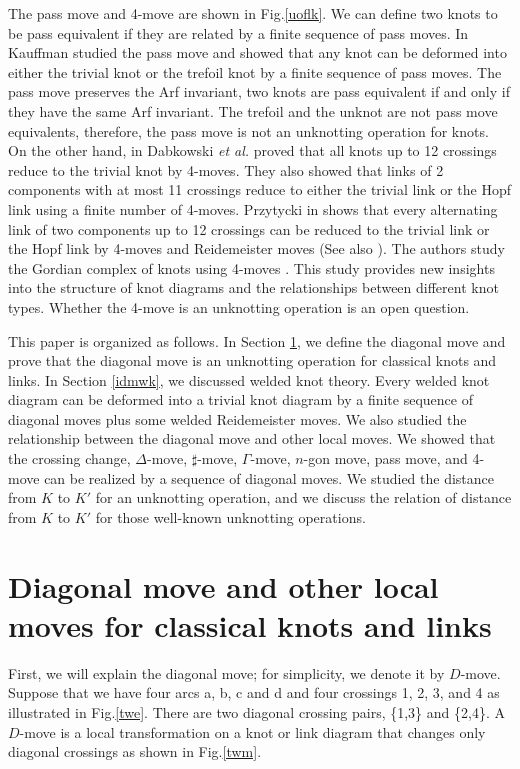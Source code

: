 \documentclass[12pt]{amsart}
\theoremstyle{remark}
\begin{document}
The pass move and 4-move are shown in Fig.\ref{uoflk}. We can define two knots to be pass equivalent if they are related by a finite sequence of pass moves.  In \cite{lhk} Kauffman studied the pass move and showed that any knot can be deformed into either the trivial knot or the trefoil knot by a finite sequence of pass moves. The pass move preserves the Arf invariant, two knots are pass equivalent if and only if they have the same Arf invariant. The trefoil and the unknot are not pass move equivalents, therefore, the pass move is not an unknotting operation for knots. On the other hand, in \cite{mk} Dabkowski {\it et al.} proved that all knots up to 12 crossings reduce to the trivial knot by 4-moves. They also showed that links of 2 components with at most 11 crossings reduce to either the trivial link or the Hopf link using a finite number of 4-moves. Przytycki in \cite{jhp} shows that every alternating link of two components up to 12 crossings can be reduced to the trivial link or the Hopf link by 4-moves and Reidemeister moves (See also \cite{as, ak1}). The authors study the Gordian complex of knots using 4-moves \cite{danish1}. This study provides new insights into the structure of knot diagrams and the relationships between different knot types. Whether the 4-move is an unknotting operation is an open question. 

 This paper is organized as follows. In Section \ref{idm}, we define the diagonal move and prove that the diagonal move is an unknotting operation for classical knots and links. In Section \ref{idmwk}, we discussed welded knot theory. Every welded knot diagram can be deformed into a trivial knot diagram by a finite sequence of diagonal moves plus some welded Reidemeister moves. We also studied the relationship between the diagonal move and other local moves. We showed that the crossing change, $\Delta$-move,  $\sharp$-move, $\Gamma$-move, $n$-gon move, pass move, and 4-move can be realized by a sequence of diagonal moves. We studied the distance from $K$ to $K'$ for an unknotting operation, and we discuss the relation of distance from $K$ to $K'$ for those well-known unknotting operations.

\section{Diagonal move and other local moves for classical knots and links}\label{idm}

First, we will explain the diagonal move; for simplicity, we denote it by $D$-move. Suppose that we have four arcs a, b, c and d and four crossings 1, 2, 3, and 4 as illustrated in Fig.\ref{twe}. There are two diagonal crossing pairs, \{1,3\} and \{2,4\}. A $D$-move is a local transformation on a knot or link diagram that changes only diagonal crossings as shown in  Fig.\ref{twm}. 
\end{document}
